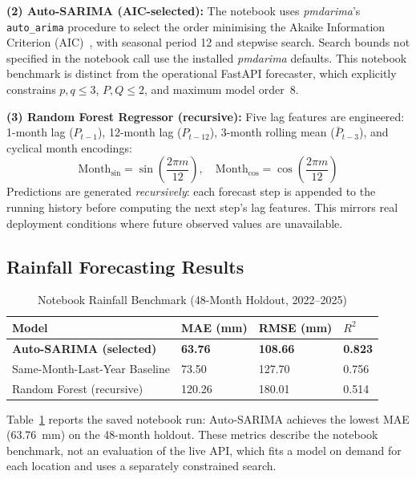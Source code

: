 ﻿\documentclass[conference]{IEEEtran}
\begin{document}
\textbf{(2) Auto-SARIMA (AIC-selected):} The notebook uses \textit{pmdarima}'s \texttt{auto\_arima} procedure to select the order minimising the Akaike Information Criterion (AIC)~\cite{smith2020}, with seasonal period 12 and stepwise search. Search bounds not specified in the notebook call use the installed \textit{pmdarima} defaults. This notebook benchmark is distinct from the operational FastAPI forecaster, which explicitly constrains $p,q \le 3$, $P,Q \le 2$, and maximum model order~8.

\textbf{(3) Random Forest Regressor (recursive):} Five lag features are engineered: 1-month lag ($P_{t-1}$), 12-month lag ($P_{t-12}$), 3-month rolling mean ($\bar{P}_{t-3}$), and cyclical month encodings:
\begin{equation}
  \text{Month}_{\sin} = \sin\!\left(\frac{2\pi m}{12}\right),\quad
  \text{Month}_{\cos} = \cos\!\left(\frac{2\pi m}{12}\right)
  \label{eq:cyclic}
\end{equation}
Predictions are generated \textit{recursively}: each forecast step is appended to the running history before computing the next step's lag features. This mirrors real deployment conditions where future observed values are unavailable.

\subsection{Rainfall Forecasting Results}

\begin{table}[htbp]
\caption{Notebook Rainfall Benchmark (48-Month Holdout, 2022--2025)}
\begin{center}
\begin{tabular}{llll}
\toprule
\textbf{Model} & \textbf{MAE (mm)} & \textbf{RMSE (mm)} & \textbf{$R^2$} \\
\midrule
\textbf{Auto-SARIMA (selected)} & \textbf{63.76} & \textbf{108.66} & \textbf{0.823} \\
Same-Month-Last-Year Baseline   & 73.50 & 127.70 & 0.756 \\
Random Forest (recursive)       & 120.26 & 180.01 & 0.514 \\
\bottomrule
\end{tabular}
\label{tab:rainfall}
\end{center}
\end{table}

Table~\ref{tab:rainfall} reports the saved notebook run: Auto-SARIMA achieves the lowest MAE (63.76~mm) on the 48-month holdout. These metrics describe the notebook benchmark, not an evaluation of the live API, which fits a model on demand for each location and uses a separately constrained search.
\end{document}
